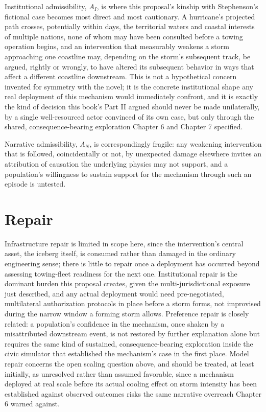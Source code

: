 \documentclass[11pt,oneside]{book}
\begin{document}
Institutional admissibility, $A_I$, is where this proposal's kinship with Stephenson's fictional case becomes most direct and most cautionary. A hurricane's projected path crosses, potentially within days, the territorial waters and coastal interests of multiple nations, none of whom may have been consulted before a towing operation begins, and an intervention that measurably weakens a storm approaching one coastline may, depending on the storm's subsequent track, be argued, rightly or wrongly, to have altered its subsequent behavior in ways that affect a different coastline downstream. This is not a hypothetical concern invented for symmetry with the novel; it is the concrete institutional shape any real deployment of this mechanism would immediately confront, and it is exactly the kind of decision this book's Part II argued should never be made unilaterally, by a single well-resourced actor convinced of its own case, but only through the shared, consequence-bearing exploration Chapter 6 and Chapter 7 specified.

Narrative admissibility, $A_N$, is correspondingly fragile: any weakening intervention that is followed, coincidentally or not, by unexpected damage elsewhere invites an attribution of causation the underlying physics may not support, and a population's willingness to sustain support for the mechanism through such an episode is untested.

\section*{Repair}

Infrastructure repair is limited in scope here, since the intervention's central asset, the iceberg itself, is consumed rather than damaged in the ordinary engineering sense; there is little to repair once a deployment has occurred beyond assessing towing-fleet readiness for the next one. Institutional repair is the dominant burden this proposal creates, given the multi-jurisdictional exposure just described, and any actual deployment would need pre-negotiated, multilateral authorization protocols in place before a storm forms, not improvised during the narrow window a forming storm allows. Preference repair is closely related: a population's confidence in the mechanism, once shaken by a misattributed downstream event, is not restored by further explanation alone but requires the same kind of sustained, consequence-bearing exploration inside the civic simulator that established the mechanism's case in the first place. Model repair concerns the open scaling question above, and should be treated, at least initially, as unresolved rather than assumed favorable, since a mechanism deployed at real scale before its actual cooling effect on storm intensity has been established against observed outcomes risks the same narrative overreach Chapter 6 warned against.
\end{document}
